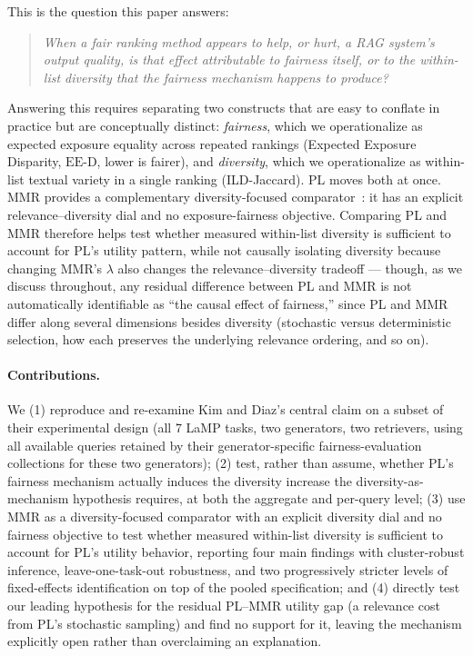 \documentclass[11pt]{article}
\newcommand{\eed}{\ensuremath{\mathrm{EE\text{-}D}}}
\begin{document}
This is the question this paper answers:

\begin{quote}
\itshape
When a fair ranking method appears to help, or hurt, a RAG system's output
quality, is that effect attributable to fairness itself, or to the
within-list diversity that the fairness mechanism happens to produce?
\end{quote}

Answering this requires separating two constructs that are easy to
conflate in practice but are conceptually distinct: \emph{fairness}, which
we operationalize as expected exposure equality across repeated rankings
(Expected Exposure Disparity, \eed, lower is fairer), and \emph{diversity},
which we operationalize as within-list textual variety in a single
ranking (ILD-Jaccard). PL moves both at once. MMR provides a
complementary diversity-focused comparator~\citep{carbonell1998mmr}: it
has an explicit relevance--diversity dial and no exposure-fairness
objective. Comparing PL and MMR therefore helps test whether measured
within-list diversity is sufficient to account for PL's utility pattern,
while not causally isolating diversity because changing MMR's $\lambda$
also changes the relevance--diversity tradeoff --- though,
as we discuss throughout, any residual difference between PL and MMR is
not automatically identifiable as ``the causal effect of fairness,''
since PL and MMR differ along
several dimensions besides diversity (stochastic versus deterministic
selection, how each preserves the underlying relevance ordering, and
so on).

\paragraph{Contributions.} We (1) reproduce and re-examine Kim and Diaz's
central claim on a subset of their experimental design (all 7 LaMP tasks,
two generators, two retrievers, using all available queries retained by
their generator-specific fairness-evaluation collections for these two
generators); (2) test, rather than assume, whether PL's fairness mechanism
actually induces the diversity increase the diversity-as-mechanism
hypothesis requires, at both the aggregate and per-query level; (3) use MMR as a diversity-focused
comparator with an explicit diversity dial and no fairness objective to
test whether measured within-list diversity is sufficient to account for
PL's utility behavior, reporting
four main findings with cluster-robust inference, leave-one-task-out
robustness, and two progressively stricter levels of fixed-effects
identification on top of the pooled specification; and (4) directly test
our leading hypothesis for the residual PL--MMR utility gap (a relevance
cost from PL's stochastic sampling) and find no support for it, leaving
the mechanism explicitly open
rather than overclaiming an explanation.
\end{document}
